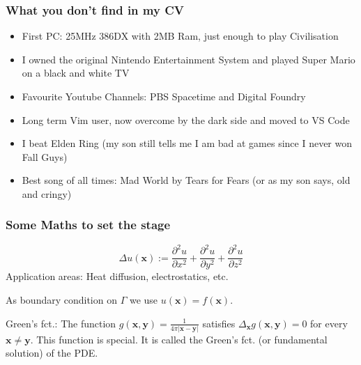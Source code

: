 \documentclass[dvipsnames,10pt]{beamer}
\def\bx{\mathbf{x}}
\def\by{\mathbf{y}}
\begin{document}
\begin{frame}
	\frametitle{What you don't find in my CV}
	
	\begin{itemize}
	\item First PC: 25MHz 386DX with 2MB Ram, just enough to play Civilisation
	\item I owned the original Nintendo Entertainment System and played Super Mario on a black and white TV
	\item Favourite Youtube Channels: PBS Spacetime and Digital Foundry
	\item Long term Vim user, now overcome by the dark side and moved to VS Code
	\item  I beat Elden Ring (my son still tells me I am bad at games since I never won Fall Guys)
	\item Best song of all times: Mad World by Tears for Fears (or as my son says, old and cringy)
	\end{itemize}
	
\end{frame}

\begin{frame}
	\frametitle{Some Maths to set the stage}
	
    \begin{minipage}{5cm}
\end{minipage}
\begin{minipage}{5cm}
$$
\Delta u(\bx) := \frac{\partial^2 u}{\partial x^2} + \frac{\partial^2 u}{\partial y^2} + \frac{\partial^2 u}{\partial z^2}
$$
Application areas: Heat diffusion, electrostatics, etc.
\end{minipage}

\vspace{.5cm}

As boundary condition on $\Gamma$ we use $u(\bx) = f(\bx)$.

\begin{tcolorbox}
Green's fct.: The function $g(\bx, \by) = \frac{1}{4\pi | \bx - \by|}$ satisfies $\Delta_{\bx}g(\bx, \by) = 0$ for every $\bx\neq \by$. This function is special. It is called the Green's fct. (or fundamental solution) of the PDE.
\end{tcolorbox}

	
\end{frame}
\end{document}
